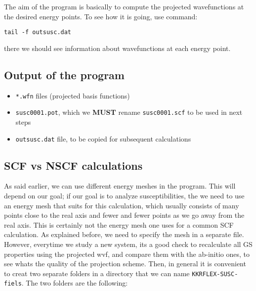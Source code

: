\documentclass[a4paper,10pt,fullpage]{report}
\begin{document}
The aim of the program is basically to compute the projected wavefunctions at the
desired energy points. To see how it is going, use command:
\begin{verbatim}
tail -f outsusc.dat
\end{verbatim}
there we should see information about wavefunctions at each energy point.


\subsection{Output of the program}

\begin{itemize}

\item \verb|*.wfn| files (projected basis functions)

\item \verb|susc0001.pot|, which we \textbf{MUST} rename  \verb|susc0001.scf| to be used in next steps

\item \verb|outsusc.dat| file, to be copied for subsequent calculations

\end{itemize}


\subsection{SCF vs NSCF calculations}
\label{subsec:kkrflexsusc-scf-nscf}

As said earlier, we can use different energy meshes in the program.
This will depend on our goal; if our goal is to analyze susceptibilities,
the we need to use an energy mesh that suits for this calculation,
which usually consists of many points close to the real axis and fewer and fewer
points as we go away from the real axis. This is certainly not the
energy mesh one uses for a common SCF calculation. As explained before, we
need to specify the mesh in a separate file. However, everytime we study a new system,
its a good check to recalculate all GS properties using the projected wvf, and
compare them with the ab-initio ones, to see whats the quality of the projection scheme.
Then, in general it is convenient to creat two separate folders
in a directory that we can name \verb|KKRFLEX-SUSC-fiels|. The two folders
are the following:
\end{document}
